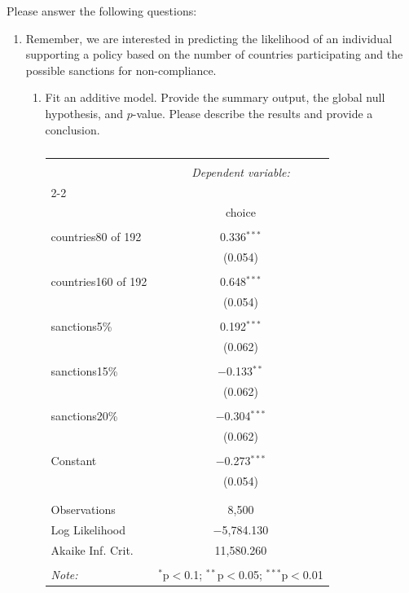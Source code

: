\documentclass[12pt,letterpaper]{article}
\begin{document}
\newpage
\noindent Please answer the following questions:

\begin{enumerate}
	\item
	Remember, we are interested in predicting the likelihood of an individual supporting a policy based on the number of countries participating and the possible sanctions for non-compliance.

	\begin{enumerate}
		\item [] Fit an additive model. Provide the summary output, the global null hypothesis, and $p$-value. Please describe the results and provide a conclusion.
\begin{table}[!htbp] \centering 
	\caption{} 
	\label{} 
	\begin{tabular}{@{\extracolsep{5pt}}lc} 
		\\[-1.8ex]\hline 
		\hline \\[-1.8ex] 
		& \multicolumn{1}{c}{\textit{Dependent variable:}} \\ 
		\cline{2-2} 
		\\[-1.8ex] & choice \\ 
		\hline \\[-1.8ex] 
		countries80 of 192 & 0.336$^{***}$ \\ 
		& (0.054) \\ 
		& \\ 
		countries160 of 192 & 0.648$^{***}$ \\ 
		& (0.054) \\ 
		& \\ 
		sanctions5\% & 0.192$^{***}$ \\ 
		& (0.062) \\ 
		& \\ 
		sanctions15\% & $-$0.133$^{**}$ \\ 
		& (0.062) \\ 
		& \\ 
		sanctions20\% & $-$0.304$^{***}$ \\ 
		& (0.062) \\ 
		& \\ 
		Constant & $-$0.273$^{***}$ \\ 
		& (0.054) \\ 
		& \\ 
		\hline \\[-1.8ex] 
		Observations & 8,500 \\ 
		Log Likelihood & $-$5,784.130 \\ 
		Akaike Inf. Crit. & 11,580.260 \\ 
		\hline 
		\hline \\[-1.8ex] 
		\textit{Note:}  & \multicolumn{1}{r}{$^{*}$p$<$0.1; $^{**}$p$<$0.05; $^{***}$p$<$0.01} \\ 
	\end{tabular} 
\end{table}  


\end{enumerate}
\end{enumerate}
\end{document}
